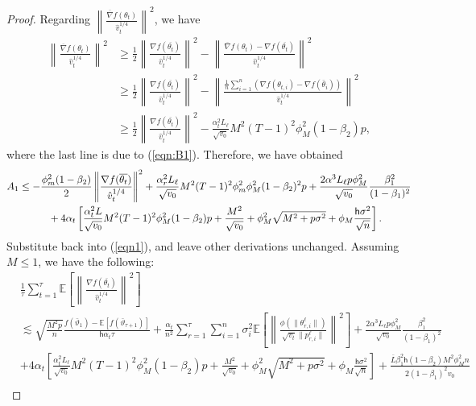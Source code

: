 \documentclass[11pt]{article}
\def\EE{\mathbb{E}}
\def\tot{\mathsf{h}}
\begin{document}
\begin{proof}
Regarding $\left\| \frac{\overline{\nabla}f(\theta_t)}{\hat v_t^{1/4}} \right\|^2$, we have
\begin{align*}
\left\| \frac{\overline{\nabla}f(\theta_t)}{\hat v_t^{1/4}} \right\|^2 & \geq \frac{1}{2} \left\| \frac{\nabla f(\overline{\theta_t})}{\hat v_t^{1/4}} \right\|^2 - \left\| \frac{\overline{\nabla}f(\theta_t)- \nabla f(\overline{\theta_t})}{\hat v_t^{1/4}} \right\|^2\\
& \geq \frac{1}{2} \left\| \frac{\nabla f(\overline{\theta_t})}{\hat v_t^{1/4}} \right\|^2 - \left\| \frac{\frac{1}{n}\sum_{i=1}^n (\nabla f(\theta_{t,i})-\nabla f(\bar\theta_i))}{\hat v_t^{1/4}} \right\|^2 \\
&\geq \frac{1}{2} \left\| \frac{\nabla f(\overline{\theta_t})}{\hat v_t^{1/4}} \right\|^2 - \frac{\alpha_t^2 L_\ell}{\sqrt{v_0}} M^2 (T-1)^2 \phi_M^2 (1-\beta_2)p,
\end{align*}
where the last line is due to (\ref{eqn:B1}). Therefore, we have obtained
\begin{align*}
    A_1&\leq -\frac{\phi_m^2(1-\beta_2)}{2}\left\| \frac{\nabla f(\overline{\theta_t})}{\hat v_t^{1/4}} \right\|^2+\frac{\alpha_r^2 L_\ell}{\sqrt{v_0}} M^2 (T-1)^2 \phi_m^2\phi_M^2 (1-\beta_2)^2p+\frac{2\alpha^3 L_\ell p\phi_M^2}{ \sqrt{v_0}}\frac{\beta_1^2}{(1-\beta_1)^2} \\
    &\hspace{0.4in}  + 4\alpha_t \left[ \frac{\alpha_t^2 L}{\sqrt{v_0}}  M^2 (T-1)^2 \phi_M^2 (1-\beta_2)p + \frac{M^2}{\sqrt{v_0}}+\phi_M^2\sqrt{M^2+p\sigma^2} + \phi_M \frac{\tot \sigma^2}{\sqrt{n}}\right].
\end{align*}
Substitute back into (\ref{eqn1}), and leave other derivations unchanged. Assuming $M\leq 1$, we have the following:
\begin{align*}
    &\frac{1}{\tau}\sum_{t=1}^\tau  \EE\left[ \left\| \frac{\nabla f(\overline{\theta_t})}{\hat v_t^{1/4}}   \right \|^2 \right] \\
    & \lesssim  \sqrt{\frac{M^2 p}{n}} \frac{ f(\bar{\vartheta}_1)  - \EE[ f(\bar{\vartheta}_{\tau+1})]}{\tot \alpha_t \tau}+   \frac{\alpha_t}{n^2}  \sum_{r=1}^\tau  \sum_{i = 1}^n  \sigma_i^2 \EE\left[ \left\|\frac{\phi(\|\theta_{r,i}^{\ell}\|)}{\sqrt{v_t} \|p_{r,i}^{\ell}\|} \right\|^2 \right] +\frac{2\alpha^3 L_\ell p\phi_M^2}{ \sqrt{v_0}}\frac{\beta_1^2}{(1-\beta_1)^2} \nonumber\\
   &   +4\alpha_t \left[ \frac{\alpha_t^2 L_\ell}{\sqrt{v_0}}  M^2 (T-1)^2 \phi_M^2 (1-\beta_2)p + \frac{M^2}{\sqrt{v_0}}+\phi_M^2\sqrt{M^2+p\sigma^2} + \phi_M \frac{\tot \sigma^2}{\sqrt{n}}\right] + \frac{ \overline{L}\beta_1^2\tot(1-\beta_2)M^2 \phi^2_M n}{2(1-\beta_1)^2 v_0}   \nonumber \\

\end{align*}
\end{proof}
\end{document}
